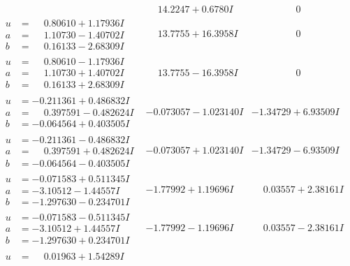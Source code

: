 \documentclass[1p]{elsarticle_modified}
\theoremstyle{definition}
\begin{document}
$$\begin{array}{c|c|c}
 & \phantom{-}14.2247 + 0.6780 I & \phantom{-0.000000 } 0 \\ \hline\begin{aligned}
u &= \phantom{-}0.80610 + 1.17936 I \\
a &= \phantom{-}1.10730 - 1.40702 I \\
b &= \phantom{-}0.16133 - 2.68309 I\end{aligned}
 & \phantom{-}13.7755 + 16.3958 I & \phantom{-0.000000 } 0 \\ \hline\begin{aligned}
u &= \phantom{-}0.80610 - 1.17936 I \\
a &= \phantom{-}1.10730 + 1.40702 I \\
b &= \phantom{-}0.16133 + 2.68309 I\end{aligned}
 & \phantom{-}13.7755 - 16.3958 I & \phantom{-0.000000 } 0 \\ \hline\begin{aligned}
u &= -0.211361 + 0.486832 I \\
a &= \phantom{-}0.397591 - 0.482624 I \\
b &= -0.064564 + 0.403505 I\end{aligned}
 & -0.073057 - 1.023140 I & -1.34729 + 6.93509 I \\ \hline\begin{aligned}
u &= -0.211361 - 0.486832 I \\
a &= \phantom{-}0.397591 + 0.482624 I \\
b &= -0.064564 - 0.403505 I\end{aligned}
 & -0.073057 + 1.023140 I & -1.34729 - 6.93509 I \\ \hline\begin{aligned}
u &= -0.071583 + 0.511345 I \\
a &= -3.10512 - 1.44557 I \\
b &= -1.297630 - 0.234701 I\end{aligned}
 & -1.77992 + 1.19696 I & \phantom{-}0.03557 + 2.38161 I \\ \hline\begin{aligned}
u &= -0.071583 - 0.511345 I \\
a &= -3.10512 + 1.44557 I \\
b &= -1.297630 + 0.234701 I\end{aligned}
 & -1.77992 - 1.19696 I & \phantom{-}0.03557 - 2.38161 I \\ \hline\begin{aligned}
u &= \phantom{-}0.01963 + 1.54289 I \\

\end{aligned}
\end{array}$$
\end{document}
